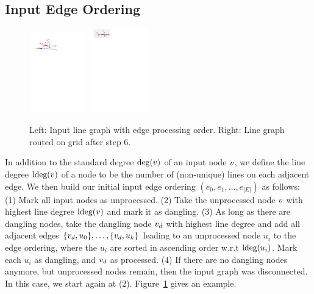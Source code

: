 \documentclass[sigconf]{acmart}
\begin{document}
\subsection{Input Edge Ordering}
%
\begin{figure}
  \centering
	\includegraphics[width=0.219\textwidth]{figures/node_order.pdf}
	\hfill
	\includegraphics[width=0.229\textwidth]{figures/partial_drawn.pdf}
	\vspace{-.3cm}
	\caption{Left: Input line graph with edge processing order. Right: Line graph routed on grid after step 6.}
	\label{FIG:order}
\end{figure}
%
In addition to the standard degree $\deg(v)$ of an input node $v$, we define the line degree $\text{ldeg}(v)$ of a node to be the number of (non-unique) lines on each adjacent edge.
We then build our initial input edge ordering $(e_0, e_1, \dots, e_{|E|})$ as follows:
  (1) Mark all input nodes as unprocessed.
  (2) Take the unprocessed node $v$ with highest line degree $\text{ldeg}(v)$ and mark it as dangling.
  (3) As long as there are dangling nodes, take the dangling node $v_d$ with highest line degree and add all adjacent edges $\{v_d, u_0\}, \dots, \{v_d, u_k\}$ leading to an unprocessed node $u_i$ to the edge ordering, where the $u_i$ are sorted in ascending order w.r.t $\text{ldeg}(u_i)$. Mark each $u_i$ as dangling, and $v_d$ as processed. 
  (4) If there are no dangling nodes anymore, but unprocessed nodes remain, then the input graph was disconnected. In this case, we start again at (2).
Figure~\ref{FIG:order} gives an example.
\end{document}
